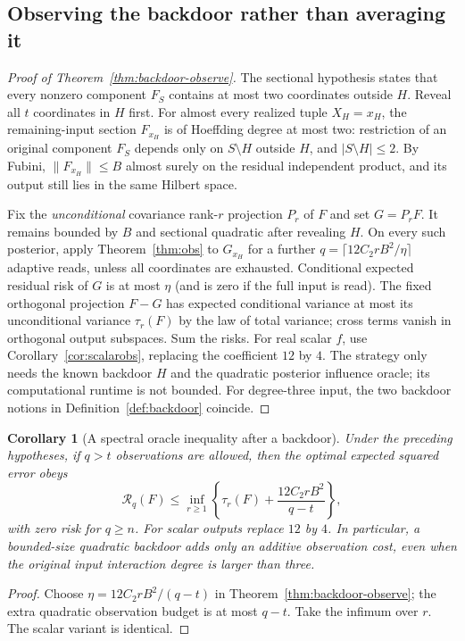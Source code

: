 \documentclass[11pt,letterpaper]{article}
\newtheorem{corollary}[theorem]{Corollary}
\theoremstyle{definition}
\begin{document}
\subsection{Observing the backdoor rather than averaging it}
\begin{proof}[Proof of Theorem~\ref{thm:backdoor-observe}]
The sectional hypothesis states that every nonzero component $F_S$
contains at most two coordinates outside $H$. Reveal all $t$
coordinates in $H$ first. For almost every realized tuple $X_H=x_H$,
the remaining-input section $F_{x_H}$ is of Hoeffding degree at most
two: restriction of an original component $F_S$ depends only on
$S\setminus H$ outside $H$, and $|S\setminus H|\le2$.
By Fubini, $\|F_{x_H}\|\le B$ almost surely on the residual independent
product, and its output still lies in the same Hilbert space.

Fix the \emph{unconditional} covariance rank-$r$ projection $P_r$ of
$F$ and set $G=P_rF$. It remains bounded by $B$ and sectional
quadratic after revealing $H$. On every such posterior, apply
Theorem~\ref{thm:obs} to $G_{x_H}$ for a further
$q=\lceil12C_2rB^2/\eta\rceil$ adaptive reads, unless all coordinates
are exhausted. Conditional expected residual risk of $G$ is at most
$\eta$ (and is zero if the full input is read). The fixed orthogonal
projection $F-G$ has expected conditional variance at most its
unconditional variance $\tau_r(F)$ by the law of total variance;
cross terms vanish in orthogonal output subspaces. Sum the risks.
For real scalar $f$, use Corollary~\ref{cor:scalarobs}, replacing the
coefficient $12$ by $4$. The strategy only needs the known backdoor
$H$ and the quadratic posterior influence oracle; its computational
runtime is not bounded. For degree-three input, the two backdoor
notions in Definition~\ref{def:backdoor} coincide.
\end{proof}

\begin{corollary}[A spectral oracle inequality after a backdoor]\label{cor:backdoor-spectrum}
Under the preceding hypotheses, if $q>t$ observations are allowed,
then the optimal expected squared error obeys
\begin{equation}\label{eq:backdoor-oracle}
\mathcal R_q(F)\le\inf_{r\ge1}\left\{\tau_r(F)
 +\frac{12C_2rB^2}{q-t}\right\},
\end{equation}
with zero risk for $q\ge n$. For scalar outputs replace $12$ by
$4$. In particular, a bounded-size quadratic backdoor adds only an
\emph{additive} observation cost, even when the original input
interaction degree is larger than three.
\end{corollary}
\begin{proof}
Choose $\eta=12C_2rB^2/(q-t)$ in
Theorem~\ref{thm:backdoor-observe}; the extra quadratic observation
budget is at most $q-t$. Take the infimum over $r$. The scalar
variant is identical.
\end{proof}
\end{document}
